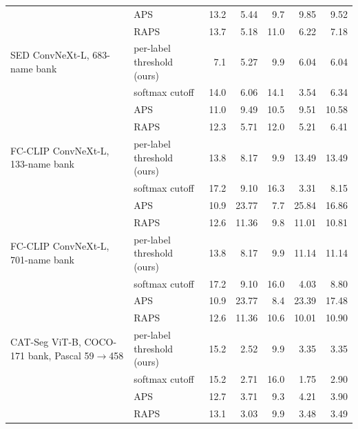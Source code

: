 \begin{tabular}{@{}llrrrrr@{}}
 & APS & 13.2 & 5.44 & 9.7 & 9.85 & 9.52 \\
 & RAPS & 13.7 & 5.18 & 11.0 & 6.22 & 7.18 \\
\midrule
SED ConvNeXt-L, 683-name bank & per-label threshold (ours) & 7.1 & 5.27 & 9.9 & 6.04 & 6.04 \\
 & softmax cutoff & 14.0 & 6.06 & 14.1 & 3.54 & 6.34 \\
 & APS & 11.0 & 9.49 & 10.5 & 9.51 & 10.58 \\
 & RAPS & 12.3 & 5.71 & 12.0 & 5.21 & 6.41 \\
\midrule
FC-CLIP ConvNeXt-L, 133-name bank & per-label threshold (ours) & 13.8 & 8.17 & 9.9 & 13.49 & 13.49 \\
 & softmax cutoff & 17.2 & 9.10 & 16.3 & 3.31 & 8.15 \\
 & APS & 10.9 & 23.77 & 7.7 & 25.84 & 16.86 \\
 & RAPS & 12.6 & 11.36 & 9.8 & 11.01 & 10.81 \\
\midrule
FC-CLIP ConvNeXt-L, 701-name bank & per-label threshold (ours) & 13.8 & 8.17 & 9.9 & 11.14 & 11.14 \\
 & softmax cutoff & 17.2 & 9.10 & 16.0 & 4.03 & 8.80 \\
 & APS & 10.9 & 23.77 & 8.4 & 23.39 & 17.48 \\
 & RAPS & 12.6 & 11.36 & 10.6 & 10.01 & 10.90 \\
\midrule
CAT-Seg ViT-B, COCO-171 bank, Pascal 59$\to$458 & per-label threshold (ours) & 15.2 & 2.52 & 9.9 & 3.35 & 3.35 \\
 & softmax cutoff & 15.2 & 2.71 & 16.0 & 1.75 & 2.90 \\
 & APS & 12.7 & 3.71 & 9.3 & 4.21 & 3.90 \\
 & RAPS & 13.1 & 3.03 & 9.9 & 3.48 & 3.49 \\
\bottomrule
\end{tabular}
